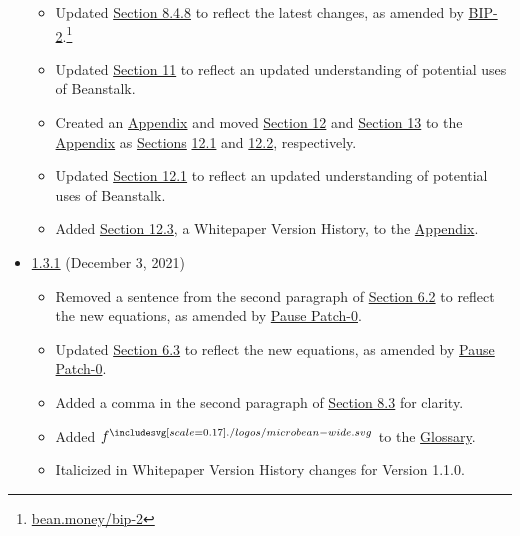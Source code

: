 \documentclass[class=article, crop=false]{standalone}
\begin{document}
\begin{itemize}[topsep=0pt, itemsep=3pt,leftmargin=16pt]
    \begin{itemize}
        \item Updated \hyperlink{subsubsection.8.4.8}{Section 8.4.8} to reflect the latest  changes, as amended by \href{https://bean.money/bip-2}{BIP-2}.\footnote{\href{https://bean.money/bip-2}{bean.money/bip-2}}
        \item Updated \hyperlink{section.11}{Section 11} to reflect an updated understanding of potential uses of Beanstalk. 
        \item Created an \hyperlink{section.14}{Appendix} and moved \hyperlink{subsection.12.1}{Section 12} and \hyperlink{subsection.12.2}{Section 13} to the \hyperlink{section.14}{Appendix} as \hyperlink{section.12}{Sections} \hyperlink{subsection.12.1}{12.1} and \hyperlink{subsection.12.2}{12.2}, respectively. 
        \item Updated \hyperlink{subsection.12.1}{Section 12.1} to reflect an updated understanding of potential uses of Beanstalk. 
        \item Added \hyperlink{subsection.12.3}{Section 12.3}, a Whitepaper Version History, to the \hyperlink{section.14}{Appendix}.
    \end{itemize}

    \newpage
    
    \item \href{https://github.com/BeanstalkFarms/Beanstalk-Whitepaper/blob/master/version-history/beanstalk1_3_1.pdf}{1.3.1} (December 3, 2021)
    
    \begin{itemize}
        \item Removed a sentence from the second paragraph of \hyperlink{subsection.6.2}{Section 6.2} to reflect the new  equations, as amended by \href{https://snapshot.org/\#/beanstalkfarms.eth/proposal/0xffc6033eb5a4e53f4da5df1c4011bacc12244914885fe11e6a6f2d09d856feed}{Pause Patch-0}.
        \item Updated \hyperlink{subsection.6.3}{Section 6.3} to reflect the new  equations, as amended by \href{https://snapshot.org/\#/beanstalkfarms.eth/proposal/0xffc6033eb5a4e53f4da5df1c4011bacc12244914885fe11e6a6f2d09d856feed}{Pause Patch-0}.
        \item Added a comma in the second paragraph of \hyperlink{subsection.8.3}{Section 8.3} for clarity.
        \item Added $f^{\bean}$ to the \hyperlink{subsection.14.11}{Glossary}. 
        \item Italicized  in Whitepaper Version History changes for Version 1.1.0.
    \end{itemize}
    

\end{itemize}
\end{document}
